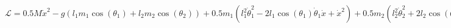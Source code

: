 \documentclass[preview]{standalone}
\begin{document}
\centering $\mathcal{L} = 0.5 M \dot{x}^{2} - g \left(l_{1} m_{1} \operatorname{cos}\left(\theta_{1}\right) + l_{2} m_{2} \operatorname{cos}\left(\theta_{2}\right)\right) + 0.5 m_{1} \left(l_{1}^{2} \dot{\theta}_{1}^{2} - 2 l_{1} \operatorname{cos}\left(\theta_{1}\right) \dot{\theta}_{1} \dot{x} + \dot{x}^{2}\right) + 0.5 m_{2} \left(l_{2}^{2} \dot{\theta}_{2}^{2} + 2 l_{2} \operatorname{cos}\left(\theta_{2}\right) \dot{\theta}_{2} \dot{x} + \dot{x}^{2}\right)$
\end{document}
